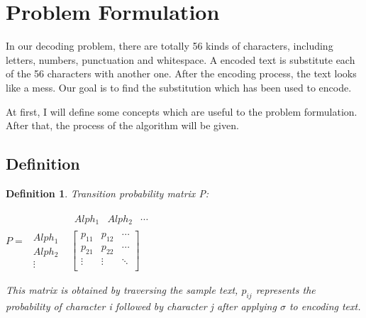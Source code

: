 \documentclass{acmtog} %
\begin{document}
\label{sub:models_of_pupil_dynamics}



\section{Problem Formulation}
In our decoding problem, there are totally 56 kinds of characters, including letters, numbers, punctuation and whitespace. A encoded text is substitute each of the 56 characters with another one. After the encoding process, the text looks like a mess. Our goal is to find the substitution which has been used to encode.

At first, I will define some concepts which are useful to the problem formulation. After that, the process of the algorithm will be given.
\subsection{Definition}

\newtheorem{myDef}{Definition} 
\begin{myDef}
    Transition probability matrix P:
    \begin{center}
        $P=
        \begin{array}{lc}
	
    	\mbox{}&
    	\begin{array}{ccc}Alph_{1}&Alph_{2}&\cdots \end{array}\\
    	\begin{array}{c}Alph_{1}\\Alph_{2}\\ \vdots\end{array}&
    	\left[\begin{array}{ccc}
    		p_{11}  &  p_{12}  & \cdots\\
    		p_{21}  &  p_{22}  & \cdots\\
    		\vdots   & \vdots & \ddots  \\
    
    	\end{array}\right]
        \end{array}$
    \end{center}
    This matrix is obtained by traversing the sample text, $p_{ij}$ represents the probability of character i followed by character j after applying $\sigma$ to encoding text.
\end{myDef}
\end{document}
